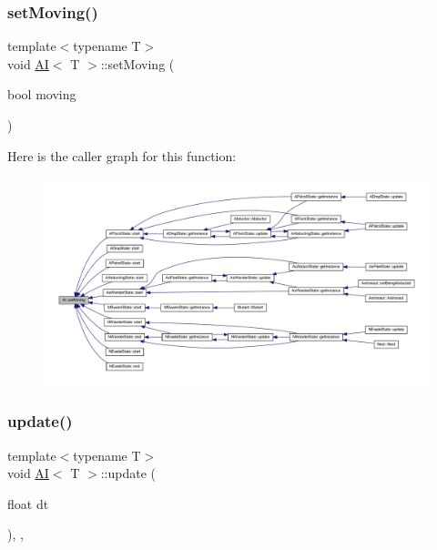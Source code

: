 \subsubsection{\texorpdfstring{set\+Moving()}{setMoving()}}
{\footnotesize\ttfamily template$<$typename T$>$ \\
void \hyperlink{class_a_i}{AI}$<$ T $>$\+::set\+Moving (\begin{DoxyParamCaption}\item[{bool}]{moving }\end{DoxyParamCaption})\hspace{0.3cm}{\ttfamily [inline]}}

Here is the caller graph for this function\+:
\nopagebreak
\begin{figure}[H]
\begin{center}
\leavevmode
\includegraphics[width=350pt]{class_a_i_ac705298af197a4e87594ee095bfceb60_icgraph}
\end{center}
\end{figure}
\mbox{\label{class_a_i_a1e1875bffd6f4da9e8333cba89aa3cd7}} 
\subsubsection{\texorpdfstring{update()}{update()}}
{\footnotesize\ttfamily template$<$typename T$>$ \\
void \hyperlink{class_a_i}{AI}$<$ T $>$\+::update (\begin{DoxyParamCaption}\item[{float}]{dt }\end{DoxyParamCaption})\hspace{0.3cm}{\ttfamily [inline]}, {\ttfamily [override]}, {\ttfamily [virtual]}}



